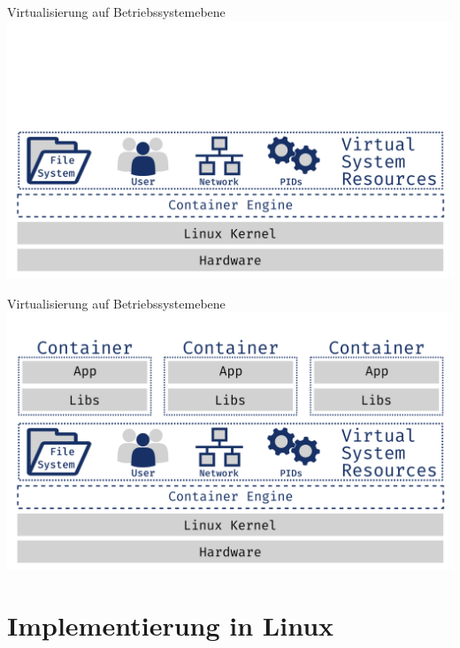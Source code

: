\documentclass{beamer}
\begin{document}
  \begin{frame}{Virtualisierung auf Betriebssystemebene}
    \includegraphics[width=\textwidth]{os-virt}
  \end{frame}
  \begin{frame}{Virtualisierung auf Betriebssystemebene}
    \includegraphics[width=\textwidth]{container}
  \end{frame}

  \section{Implementierung in Linux}
\end{document}
